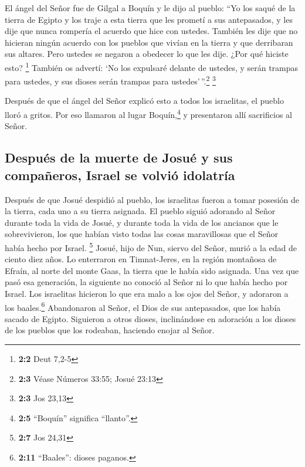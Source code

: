  El ángel del Señor fue de Gilgal a Boquín y le dijo al
pueblo: ``Yo los saqué de la tierra de Egipto y los traje a esta tierra
que les prometí a sus antepasados, y les dije que nunca rompería el
acuerdo que hice con ustedes.  También les dije que no
hicieran ningún acuerdo con los pueblos que vivían en la tierra y que
derribaran sus altares. Pero ustedes se negaron a obedecer lo que les
dije. ¿Por qué hiciste esto? \footnote{\textbf{2:2} Deut 7,2-5}
 También os advertí: `No los expulsaré delante de ustedes,
y serán trampas para ustedes, y sus dioses serán trampas para
ustedes'\,''.\footnote{\textbf{2:3} Véase Números 33:55; Josué 23:13}
\footnote{\textbf{2:3} Jos 23,13}

 Después de que el ángel del Señor explicó esto a todos
los israelitas, el pueblo lloró a gritos.  Por eso
llamaron al lugar Boquín,\footnote{\textbf{2:5} ``Boquín'' significa
  ``llanto''.} y presentaron allí sacrificios al Señor.

\hypertarget{despuuxe9s-de-la-muerte-de-josuuxe9-y-sus-compauxf1eros-israel-se-volviuxf3-idolatruxeda}{%
\subsection{Después de la muerte de Josué y sus compañeros, Israel se
volvió
idolatría}\label{despuuxe9s-de-la-muerte-de-josuuxe9-y-sus-compauxf1eros-israel-se-volviuxf3-idolatruxeda}}

 Después de que Josué despidió al pueblo, los israelitas
fueron a tomar posesión de la tierra, cada uno a su tierra asignada.
 El pueblo siguió adorando al Señor durante toda la vida
de Josué, y durante toda la vida de los ancianos que le sobrevivieron,
los que habían visto todas las cosas maravillosas que el Señor había
hecho por Israel. \footnote{\textbf{2:7} Jos 24,31} 
Josué, hijo de Nun, siervo del Señor, murió a la edad de ciento diez
años.  Lo enterraron en Timnat-Jeres, en la región
montañosa de Efraín, al norte del monte Gaas, la tierra que le había
sido asignada.  Una vez que pasó esa generación, la
siguiente no conoció al Señor ni lo que había hecho por Israel.
 Los israelitas hicieron lo que era malo a los ojos del
Señor, y adoraron a los baales.\footnote{\textbf{2:11} ``Baales'':
  dioses paganos.}  Abandonaron al Señor, el Dios de sus
antepasados, que los había sacado de Egipto. Siguieron a otros dioses,
inclinándose en adoración a los dioses de los pueblos que los rodeaban,
haciendo enojar al Señor.

